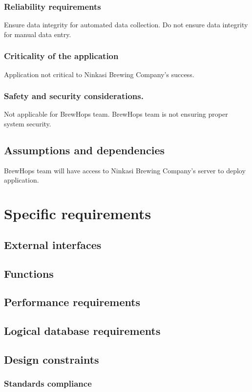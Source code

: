 \documentclass[draftclsnofoot,onecolumn,letterpaper,10pt,compsoc]{IEEEtran}
\begin{document}
		\subsubsection{Reliability requirements}
        Ensure data integrity for automated data collection. Do not ensure data integrity for manual data entry.
        
		\subsubsection{Criticality of the application}
        Application not critical to Ninkasi Brewing Company's success.
        
		\subsubsection{Safety and security considerations.}
        Not applicable for BrewHops team. BrewHops team is not ensuring proper system security.
        
	\subsection{Assumptions and dependencies}
    BrewHops team will have access to Ninkasi Brewing Company's server to deploy application.

\section{Specific requirements}
	\subsection{External interfaces}
	\subsection{Functions}
	\subsection{Performance requirements}
	\subsection{Logical database requirements}
	\subsection{Design constraints}
		\subsubsection{Standards compliance}
\end{document}

